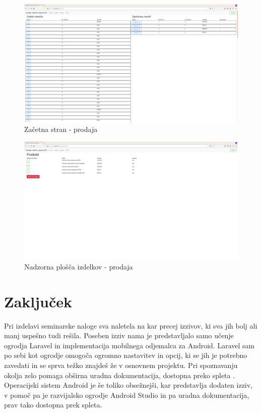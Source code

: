 \documentclass[a4paper,12pt]{report}
\begin{document}
\begin{figure}[h]
    \centering
    \includegraphics[width=\linewidth]{slike/splet/prodajalec_index.png}
    \caption{Začetna stran - prodaja}
    \label{fig:index_prodajalec}
\end{figure}

\begin{figure}[h]
    \centering
    \includegraphics[width=\linewidth]{slike/splet/prodajalec_produkti.png}
    \caption{Nadzorna plošča izdelkov - prodaja}
    \label{fig:products_prodajalec}
\end{figure}



\chapter{Zaključek}

Pri izdelavi seminarske naloge sva naletela na kar precej izzivov, ki sva jih bolj ali manj uspešno tudi rešila. Poseben izziv nama je predstavljalo samo učenje ogrodja Laravel in implementacija mobilnega odjemalca za Android. Laravel sam po sebi kot ogrodje omogoča ogromno nastavitev in opcij, ki se jih je potrebno zavedati in se sprva težko znajdeš že v osnovnem projektu. Pri spoznavanju okolja zelo pomaga obširna uradna dokumentacija, dostopna preko spleta \cite{bib:laravel}. Operacijski sistem Android je še toliko obsežnejši, kar predstavlja dodaten izziv, v pomoč pa je razvijalsko ogrodje Android Studio in pa uradna dokumentacija, prav tako dostopna prek spleta.
\end{document}
